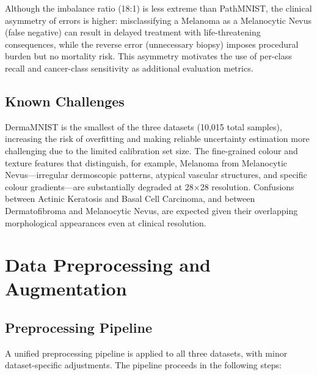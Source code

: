 Although the imbalance ratio (18:1) is less extreme than PathMNIST, the clinical asymmetry of errors is higher: misclassifying a Melanoma as a Melanocytic Nevus (false negative) can result in delayed treatment with life-threatening consequences, while the reverse error (unnecessary biopsy) imposes procedural burden but no mortality risk. This asymmetry motivates the use of per-class recall and cancer-class sensitivity as additional evaluation metrics.

\subsection{Known Challenges}

DermaMNIST is the smallest of the three datasets (10,015 total samples), increasing the risk of overfitting and making reliable uncertainty estimation more challenging due to the limited calibration set size. The fine-grained colour and texture features that distinguish, for example, Melanoma from Melanocytic Nevus—irregular dermoscopic patterns, atypical vascular structures, and specific colour gradients—are substantially degraded at 28$\times$28 resolution. Confusions between Actinic Keratosis and Basal Cell Carcinoma, and between Dermatofibroma and Melanocytic Nevus, are expected given their overlapping morphological appearances even at clinical resolution.

\section{Data Preprocessing and Augmentation}

\subsection{Preprocessing Pipeline}

A unified preprocessing pipeline is applied to all three datasets, with minor dataset-specific adjustments. The pipeline proceeds in the following steps:


